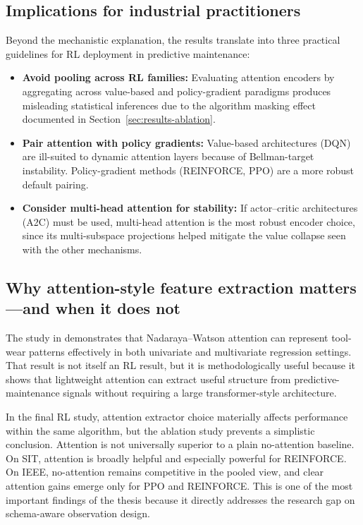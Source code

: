 \documentclass[12pt,oneside]{book}
\begin{document}
\subsection{Implications for industrial practitioners}
Beyond the mechanistic explanation, the results translate into three practical guidelines for RL deployment in predictive maintenance:
\begin{itemize}
    \item \textbf{Avoid pooling across RL families:} Evaluating attention encoders by aggregating across value-based and policy-gradient paradigms produces misleading statistical inferences due to the algorithm masking effect documented in Section~\ref{sec:results-ablation}.
    \item \textbf{Pair attention with policy gradients:} Value-based architectures (\textsc{DQN}) are ill-suited to dynamic attention layers because of Bellman-target instability. Policy-gradient methods (\textsc{REINFORCE}, \textsc{PPO}) are a more robust default pairing.
    \item \textbf{Consider multi-head attention for stability:} If actor--critic architectures (\textsc{A2C}) must be used, multi-head attention is the most robust encoder choice, since its multi-subspace projections helped mitigate the value collapse seen with the other mechanisms.
\end{itemize}

\subsection{Why attention-style feature extraction matters---and when it does not}
The study in \cite{Siraskar2024NW} demonstrates that Nadaraya--Watson attention can represent tool-wear patterns effectively in both univariate and multivariate regression settings. That result is not itself an RL result, but it is methodologically useful because it shows that lightweight attention can extract useful structure from predictive-maintenance signals without requiring a large transformer-style architecture.

In the final RL study, attention extractor choice materially affects performance within the same algorithm, but the ablation study prevents a simplistic conclusion. Attention is not universally superior to a plain no-attention baseline. On SIT, attention is broadly helpful and especially powerful for \textsc{REINFORCE}. On IEEE, no-attention remains competitive in the pooled view, and clear attention gains emerge only for PPO and \textsc{REINFORCE}. This is one of the most important findings of the thesis because it directly addresses the research gap on schema-aware observation design.
\end{document}
